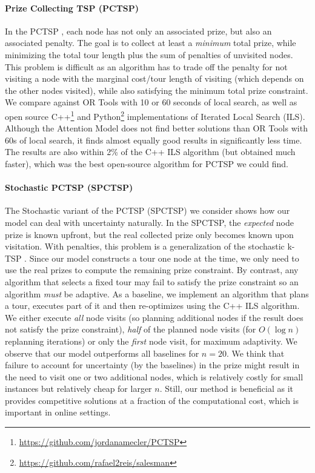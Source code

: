 \paragraph{Prize Collecting TSP (PCTSP)}
In the PCTSP \citep{balas1989prize}, each node has not only an associated prize, but also an associated penalty. The goal is to collect at least a \emph{minimum} total prize, while minimizing the total tour length plus the sum of penalties of unvisited nodes. This problem is difficult as an algorithm has to trade off the penalty for not visiting a node with the marginal cost/tour length of visiting (which depends on the other nodes visited), while also satisfying the minimum total prize constraint. We compare against OR Tools with 10 or 60 seconds of local search, as well as open source C++\footnote{\url{https://github.com/jordanamecler/PCTSP}} and Python\footnote{\url{https://github.com/rafael2reis/salesman}} implementations of Iterated Local Search (ILS). Although the Attention Model does not find better solutions than OR Tools with 60s of local search, it finds almost equally good results in significantly less time. The results are also within 2\% of the C++ ILS algorithm (but obtained much faster), which was the best open-source algorithm for PCTSP we could find.

\paragraph{Stochastic PCTSP (SPCTSP)}
The Stochastic variant of the PCTSP (SPCTSP) we consider shows how our model can deal with uncertainty naturally. In the SPCTSP, the \emph{expected} node prize is known upfront, but the real collected prize only becomes known upon visitation. With penalties, this problem is a generalization of the stochastic k-TSP \citep{ene2018approximation}. Since our model constructs a tour one node at the time, we only need to use the real prizes to compute the remaining prize constraint. By contrast, any algorithm that selects a fixed tour may fail to satisfy the prize constraint so an algorithm \emph{must} be adaptive. As a baseline, we implement an algorithm that plans a tour, executes part of it and then re-optimizes using the C++ ILS algorithm. We either execute \emph{all} node visits (so planning additional nodes if the result does not satisfy the prize constraint), \emph{half} of the planned node visits (for $O(\log n)$ replanning iterations) or only the \emph{first} node visit, for maximum adaptivity. We observe that our model outperforms all baselines for $n = 20$. We think that failure to account for uncertainty (by the baselines) in the prize might result in the need to visit one or two additional nodes, which is relatively costly for small instances but relatively cheap for larger $n$. Still, our method is beneficial as it provides competitive solutions at a fraction of the computational cost, which is important in online settings.

